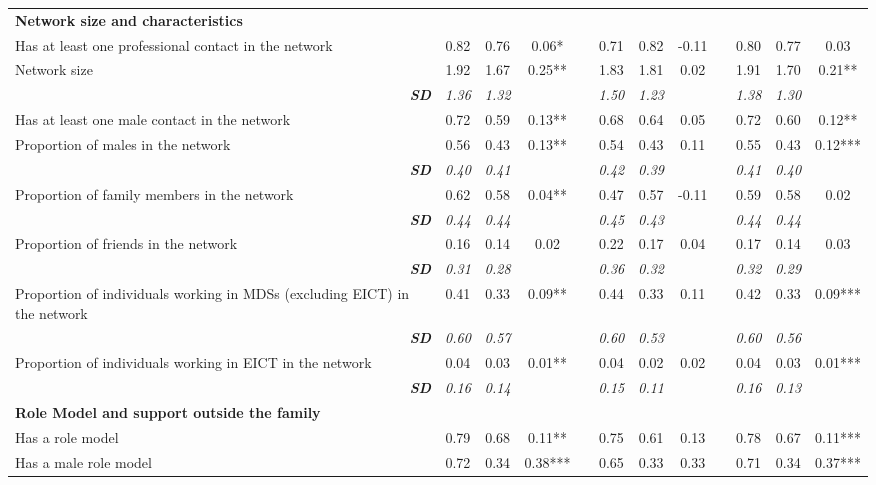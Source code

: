 \begin{landscape}
{\begin{longtable}{m{9cm}ccccccccccc}
\textbf{Network size and characteristics}&&&&&&&&&&&\\
Has at least one professional contact in the network&0.82&0.76&     0.06*&&0.71&0.82&    -0.11 &&0.80&0.77&     0.03 \\
Network size&1.92&1.67&     0.25**&&1.83&1.81&     0.02 &&1.91&1.70&     0.21**\\
\multicolumn{1}{r}{\textit{\textbf{SD}}}&\textit{1.36}&\textit{1.32}&&&\textit{1.50}&\textit{1.23}&&&\textit{1.38}&\textit{1.30}&\\
Has at least one male contact in the network&0.72&0.59&     0.13**&&0.68&0.64&     0.05 &&0.72&0.60&     0.12**\\
Proportion of males in the network&0.56&0.43&     0.13**&&0.54&0.43&     0.11 &&0.55&0.43&     0.12***\\
\multicolumn{1}{r}{\textit{\textbf{SD}}}&\textit{0.40}&\textit{0.41}&&&\textit{0.42}&\textit{0.39}&&&\textit{0.41}&\textit{0.40}&\\
Proportion of family members in the network&0.62&0.58&     0.04**&&0.47&0.57&    -0.11 &&0.59&0.58&     0.02 \\
\multicolumn{1}{r}{\textit{\textbf{SD}}}&\textit{0.44}&\textit{0.44}&&&\textit{0.45}&\textit{0.43}&&&\textit{0.44}&\textit{0.44}&\\
Proportion of friends in the network&0.16&0.14&     0.02 &&0.22&0.17&     0.04 &&0.17&0.14&     0.03 \\
\multicolumn{1}{r}{\textit{\textbf{SD}}}&\textit{0.31}&\textit{0.28}&&&\textit{0.36}&\textit{0.32}&&&\textit{0.32}&\textit{0.29}&\\
Proportion of individuals working in MDSs (excluding EICT) in the network&0.41&0.33&     0.09**&&0.44&0.33&     0.11 &&0.42&0.33&     0.09***\\
\multicolumn{1}{r}{\textit{\textbf{SD}}}&\textit{0.60}&\textit{0.57}&&&\textit{0.60}&\textit{0.53}&&&\textit{0.60}&\textit{0.56}&\\
Proportion of individuals working in EICT in the network&0.04&0.03&     0.01**&&0.04&0.02&     0.02 &&0.04&0.03&     0.01***\\
\multicolumn{1}{r}{\textit{\textbf{SD}}}&\textit{0.16}&\textit{0.14}&&&\textit{0.15}&\textit{0.11}&&&\textit{0.16}&\textit{0.13}&\\
\textbf{Role Model and support outside the family}&&&&&&&&&&&\\
Has a role model&0.79&0.68&     0.11**&&0.75&0.61&     0.13 &&0.78&0.67&     0.11***\\
Has a male role model&0.72&0.34&     0.38***&&0.65&0.33&     0.33 &&0.71&0.34&     0.37***\\

\end{longtable}}
\end{landscape}
